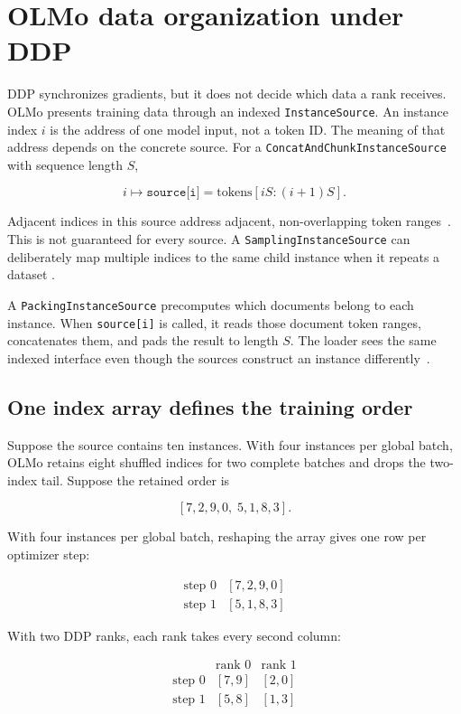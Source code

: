 \documentclass[11pt]{article}
\begin{document}
\newpage
\section{OLMo data organization under DDP}

DDP synchronizes gradients, but it does not decide which data a rank receives.
OLMo presents training data through an indexed \texttt{InstanceSource}. An
instance index \(i\) is the address of one model input, not a token ID. The
meaning of that address depends on the concrete source. For a
\texttt{ConcatAndChunkInstanceSource} with sequence length \(S\),

\[
i \longmapsto \texttt{source[i]}
= \text{tokens}[iS:(i+1)S].
\]

Adjacent indices in this source address adjacent, non-overlapping token
ranges~\cite{olmo-concat-and-chunk-source}. This is not guaranteed for every
source. A \texttt{SamplingInstanceSource} can deliberately map multiple
indices to the same child instance when it repeats a dataset
\cite{olmo-sampling-instance-source}.

A \texttt{PackingInstanceSource} precomputes which documents belong to each
instance. When \texttt{source[i]} is called, it reads those document token
ranges, concatenates them, and pads the result to length \(S\). The loader
sees the same indexed interface even though the sources construct an instance
differently~\cite{olmo-instance-source,olmo-packing-source}.

\subsection{One index array defines the training order}

Suppose the source contains ten instances. With four instances per global
batch, OLMo retains eight shuffled indices for two complete batches and drops
the two-index tail. Suppose the retained order is

\[
[7,2,9,0,\;5,1,8,3].
\]

With four instances per global batch, reshaping the array gives one row per
optimizer step:

\[
\begin{array}{c|c}
\text{step 0} & [7,2,9,0] \\
\text{step 1} & [5,1,8,3]
\end{array}
\]

With two DDP ranks, each rank takes every second column:

\[
\begin{array}{c|cc}
 & \text{rank 0} & \text{rank 1} \\
\hline
\text{step 0} & [7,9] & [2,0] \\
\text{step 1} & [5,8] & [1,3]
\end{array}
\]
\end{document}
